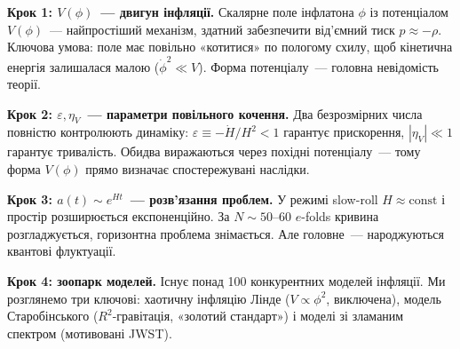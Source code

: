 \begin{center}
\end{center}

\medskip
\noindent\textbf{Крок 1: $V(\phi)$~--- двигун інфляції.}
Скалярне поле інфлатона $\phi$ із потенціалом $V(\phi)$~---
найпростіший механізм, здатний забезпечити від'ємний тиск
$p \approx -\rho$. Ключова умова: поле має повільно «котитися»
по пологому схилу, щоб кінетична енергія залишалася малою
($\dot{\phi}^2 \ll V$). Форма потенціалу~--- головна
невідомість теорії.

\medskip
\noindent\textbf{Крок 2: $\varepsilon, \eta_V$~--- параметри повільного кочення.}
Два безрозмірних числа повністю контролюють динаміку:
$\varepsilon \equiv -\dot{H}/H^2 < 1$ гарантує прискорення,
$|\eta_V| \ll 1$ гарантує тривалість. Обидва виражаються
через похідні потенціалу~--- тому форма $V(\phi)$ прямо
визначає спостережувані наслідки.

\medskip
\noindent\textbf{Крок 3: $a(t) \sim e^{Ht}$~--- розв'язання проблем.}
У режимі slow-roll $H \approx \mathrm{const}$ і простір
розширюється експоненційно. За $N \sim 50$--$60$ $e$-folds
кривина розгладжується, горизонтна проблема знімається.
Але головне~--- народжуються квантові флуктуації.

\medskip
\noindent\textbf{Крок 4: зоопарк моделей.}
Існує понад 100 конкурентних моделей інфляції. Ми розглянемо
три ключові: хаотичну інфляцію Лінде ($V\propto\phi^2$,
виключена), модель Старобінського ($R^2$-гравітація, «золотий
стандарт») і моделі зі зламаним спектром (мотивовані JWST).

